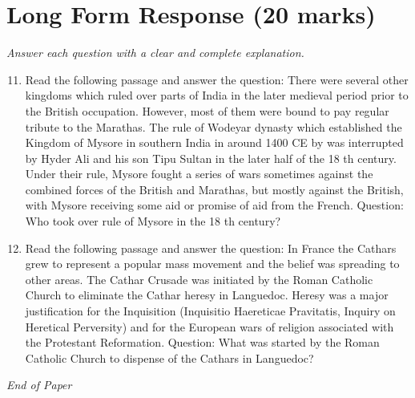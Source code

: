 \documentclass[12pt]{article}
\begin{document}
\section*{Long Form Response (20 marks)}
\textit{Answer each question with a clear and complete explanation.}
\begin{enumerate}[label=\arabic*.]
\setcounter{enumi}{10}
\item Read the following passage and answer the question: There were several other kingdoms which ruled over parts of India in the later medieval period prior to the British occupation. However, most of them were bound to pay regular tribute to the Marathas. The rule of Wodeyar dynasty which established the Kingdom of Mysore in southern India in around 1400 CE by was interrupted by Hyder Ali and his son Tipu Sultan in the later half of the 18 th century. Under their rule, Mysore fought a series of wars sometimes against the combined forces of the British and Marathas, but mostly against the British, with Mysore receiving some aid or promise of aid from the French. Question: Who took over rule of Mysore in the 18 th century?
\item Read the following passage and answer the question: In France the Cathars grew to represent a popular mass movement and the belief was spreading to other areas. The Cathar Crusade was initiated by the Roman Catholic Church to eliminate the Cathar heresy in Languedoc. Heresy was a major justification for the Inquisition (Inquisitio Haereticae Pravitatis, Inquiry on Heretical Perversity) and for the European wars of religion associated with the Protestant Reformation. Question: What was started by the Roman Catholic Church to dispense of the Cathars in Languedoc?
\end{enumerate}

\vfill
\noindent\textit{End of Paper}
\end{document}
